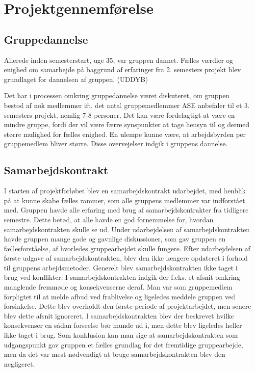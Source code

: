 \chapter{Projektgennemførelse}
\section{Gruppedannelse}
Allerede inden semesterstart, uge 35, var gruppen dannet. Fælles værdier og enighed om samarbejde på baggrund af erfaringer fra 2. semesters projekt blev grundlaget for dannelsen af gruppen. (UDDYB)

Det har i processen omkring gruppedannelse været diskuteret, om gruppen bestod af nok medlemmer ift. det antal gruppemedlemmer ASE anbefaler til et 3. semesters projekt, nemlig 7-8 personer. Det kan være fordelagtigt at være en mindre gruppe, fordi der vil være færre synspunkter at tage hensyn til og dermed større mulighed for fælles enighed. En ulempe kunne være, at arbejdsbyrden per gruppemedlem bliver større. Disse overvejelser indgik i gruppens dannelse.\\

\section{Samarbejdskontrakt}
I starten af projektforløbet blev en samarbejdskontrakt udarbejdet, med henblik på at kunne skabe fælles rammer, som alle gruppens medlemmer var indforstået med. Gruppen havde alle erfaring med brug af samarbejdskontrakter fra tidligere semestre. Dette betød, at alle havde en god fornemmelse for, hvordan samarbejdskontrakten skulle se ud. Under udarbejdelsen af samarbejdskontrakten havde gruppen mange gode og gavnlige diskussioner, som gav gruppen en fællesforståelse, af hvorledes gruppearbejdet skulle fungere. Efter udarbejdelsen af første udgave af samarbejdskontrakten, blev den ikke længere opdateret i forhold til gruppens arbejdsmetoder. Generelt blev samarbejdskontrakten ikke taget i brug ved konflikter. I samarbejdskontrakten indgik der f.eks. et afsnit omkring manglende fremmøde og konsekvenserne deraf. Man var som gruppemedlem forpligtet til at melde afbud ved frablivelse og ligeledes meddele gruppen ved forsinkelse. Dette blev overholdt den første periode af projektarbejdet, men senere blev dette afsnit ignoreret. I samarbejdskontrakten blev der beskrevet hvilke konsekvenser en sådan forseelse bør munde ud i, men dette blev ligeledes heller ikke taget i brug. Som konklusion kan man sige at samarbejdskontrakten som udgangspunkt gav gruppen et fælles grundlag for det fremtidige gruppearbejde, men da det var mest nødvendigt at bruge samarbejdskontrakten blev den negligeret.
 
